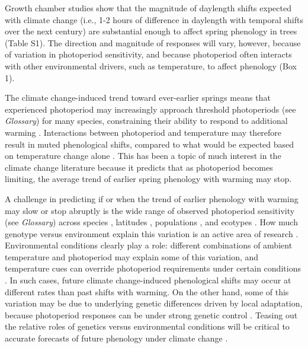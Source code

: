 \documentclass{article}
\begin{document}
\par Growth chamber studies show that the magnitude of daylength shifts expected with climate change (i.e., 1-2 hours of difference in daylength with temporal shifts over the next century) are substantial enough to affect spring phenology in trees (Table S1). The direction and magnitude of responses will vary, however, because of variation in photoperiod sensitivity, and because photoperiod often interacts with other environmental drivers, such as temperature, to affect phenology (Box 1). 

\par The climate change-induced trend toward ever-earlier springs means that experienced photoperiod may increasingly approach threshold photoperiods (see \emph{Glossary}) for many species, constraining their ability to respond to additional warming \citep{fu2019,vitasse2013,koerner2010a,Morin:2010aa,Nienstaedt:1966aa}. Interactions between photoperiod and temperature may therefore result in muted phenological shifts, compared to what would be expected based on temperature change alone \citep{koerner2010a,mimura2007,wareing1956}. This has been a topic of much interest in the climate change literature because it predicts that as photoperiod becomes limiting, the average trend of earlier spring phenology with warming \citep{polgar2013,penuelas2002,menzel2000} may stop.%

 \par A challenge in predicting if or when the trend of earlier phenology with warming may slow or stop abruptly is the wide range of observed photoperiod sensitivity (see \emph{Glossary}) across species \citep{flynn2018,zohner2016,Sanz-Perez:2009aa}, latitudes \citep{ettinger2020,Partanen:2005aa,johnsen1996}, populations \citep{gauzere2017,saikkonen2012,Caffarra:2011b,bradshaw2007,Vihera-Aarnio:2006aa}, and ecotypes \citep{Howe:1995aa}. How much genotype versus environment explain this variation is an active area of research \citep[e.g.,][]{frejaville2019,franks2014,gould2010,mimura2010}. Environmental conditions clearly play a role: different combinations of ambient temperature and photoperiod may explain some of this variation, and temperature cues can override photoperiod requirements under certain conditions \citep [e.g.,][] {tanino2010}. In such cases, future climate change-induced phenological shifts may occur at different rates than past shifts with warming. On the other hand, some of this variation may be due to underlying genetic differences driven by local adaptation, because photoperiod responses can be under strong genetic control \citep[][see also Boxes 1, 2]{bradshaw1995,keller2011,weih2004}. Teasing out the relative roles of genetics versus environmental conditions will be critical to accurate forecasts of future phenology under climate change \citep{pau2011}.
\end{document}
